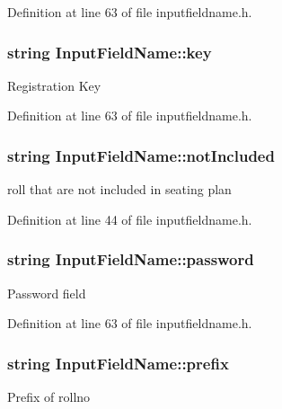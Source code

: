 Definition at line 63 of file inputfieldname.\-h.

\hypertarget{classInputFieldName_a26cffcb455cb1b977aa60b68c5b48fe4}{
\subsubsection[{key}]{\setlength{\rightskip}{0pt plus 5cm}string Input\-Field\-Name\-::key}}\label{classInputFieldName_a26cffcb455cb1b977aa60b68c5b48fe4}
Registration Key 

Definition at line 63 of file inputfieldname.\-h.

\hypertarget{classInputFieldName_a9ee6ee84737e1199bdfd9fb24c82c2c7}{
\subsubsection[{not\-Included}]{\setlength{\rightskip}{0pt plus 5cm}string Input\-Field\-Name\-::not\-Included}}\label{classInputFieldName_a9ee6ee84737e1199bdfd9fb24c82c2c7}
roll that are not included in seating plan 

Definition at line 44 of file inputfieldname.\-h.

\hypertarget{classInputFieldName_a318f819ef4663d7e5f40d91180093cb9}{
\subsubsection[{password}]{\setlength{\rightskip}{0pt plus 5cm}string Input\-Field\-Name\-::password}}\label{classInputFieldName_a318f819ef4663d7e5f40d91180093cb9}
Password field 

Definition at line 63 of file inputfieldname.\-h.

\hypertarget{classInputFieldName_a161d155f8faca2c5dea1bbd607b17553}{
\subsubsection[{prefix}]{\setlength{\rightskip}{0pt plus 5cm}string Input\-Field\-Name\-::prefix}}\label{classInputFieldName_a161d155f8faca2c5dea1bbd607b17553}
Prefix of rollno 

